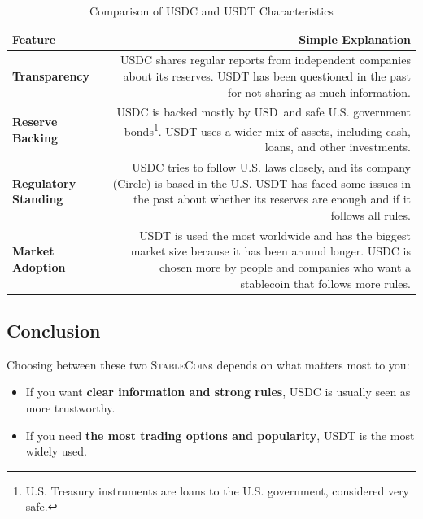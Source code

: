 \documentclass{article}
\newcommand{\stablecoin}{\textsc{StableCoin}}
\newcommand{\usd}{\textsc{USD}}
\begin{document}
\begin{table}[h!]
    \centering
    \setlength{\tabcolsep}{6pt}
    \renewcommand{\arraystretch}{1.5}
    \begin{tabular}{@{} >{\bfseries}L R @{}}
        \toprule
        \textbf{Feature} & \textbf{Simple Explanation} \\
        \midrule
        \textbf{Transparency} & USDC shares regular reports from independent 
        companies about its reserves. USDT has been questioned in the past 
        for not sharing as much information. \\
        \textbf{Reserve Backing} & USDC is backed mostly by \usd\ and safe 
        U.S. government bonds\footnote{U.S. Treasury instruments are loans 
        to the U.S. government, considered very safe.}. USDT uses a wider 
        mix of assets, including cash, loans, and other investments. \\
        \textbf{Regulatory Standing} & USDC tries to follow U.S. laws 
        closely, and its company (Circle) is based in the U.S. USDT has 
        faced some issues in the past about whether its reserves are 
        enough and if it follows all rules. \\
        \textbf{Market Adoption} & USDT is used the most worldwide and 
        has the biggest market size because it has been around longer. 
        USDC is chosen more by people and companies who want a stablecoin 
        that follows more rules. \\
        \bottomrule
    \end{tabular}
    \caption{Comparison of USDC and USDT Characteristics}
    \label{tab:comparison}
\end{table}

\subsection*{Conclusion}

\noindent Choosing between these two \stablecoin s depends on what matters most to you:

\begin{itemize}
    \item If you want \textbf{clear information and strong rules}, USDC is usually seen as more trustworthy.
    \item If you need \textbf{the most trading options and popularity}, USDT is the most widely used.
\end{itemize}
\end{document}
